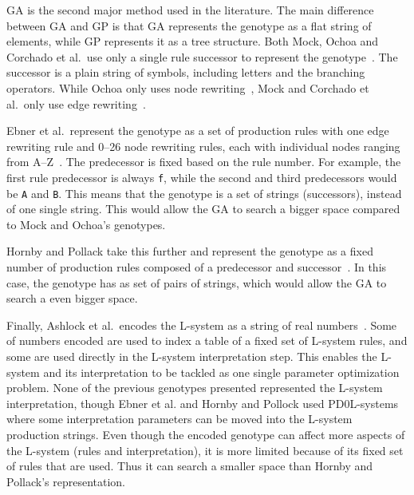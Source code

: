 \gls{GA} is the second major method used in the literature.
The main difference between \gls{GA} and \gls{GP} is that \gls{GA} represents the genotype as a flat string of elements, while \gls{GP} represents it as a tree structure.
Both Mock, Ochoa and Corchado et al.\ use only a single rule successor to represent the genotype~\cite{1998Mock,1998Ochoa,2009Corchado}.
The successor is a plain string of symbols, including letters and the branching operators.
While Ochoa only uses node rewriting~\cite{1998Ochoa}, Mock and Corchado et al.\ only use edge rewriting~\cite{1998Mock, 2009Corchado}.

Ebner et al.\ represent the genotype as a set of production rules with one edge rewriting rule and 0--26 node rewriting rules, each with individual nodes ranging from A--Z~\cite{2002Ebner,2003Ebner}.
The predecessor is fixed based on the rule number.
For example, the first rule predecessor is always \texttt{f}, while the second and third predecessors would be \texttt{A} and \texttt{B}.
This means that the genotype is a set of strings (successors), instead of one single string.
This would allow the \gls{GA} to search a bigger space compared to Mock and Ochoa's genotypes.

Hornby and Pollack take this further and represent the genotype as a fixed number of production rules composed of a predecessor and successor~\cite{2001Hornby}.
In this case, the genotype has as set of pairs of strings, which would allow the \gls{GA} to search a even bigger space.

Finally, Ashlock et al.\ encodes the \gls{L-system} as a string of real numbers~\cite{2006Ashlock}.
Some of numbers encoded are used to index a table of a fixed set of \gls{L-system} rules, and some are used directly in the \gls{L-system} interpretation step.
This enables the \gls{L-system} and its interpretation to be tackled as one single parameter optimization problem.
None of the previous genotypes presented represented the \gls{L-system} interpretation, though Ebner et al. and Hornby and Pollock used PD0L-systems where some interpretation parameters can be moved into the \gls{L-system} production strings.
Even though the encoded genotype can affect more aspects of the \gls{L-system} (rules and interpretation), it is more limited because of its fixed set of rules that are used.
Thus it can search a smaller space than Hornby and Pollack's representation.

